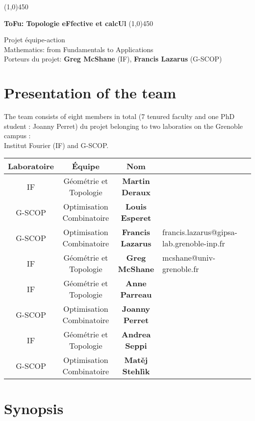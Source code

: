 \documentclass[14pt,fleqn]{article}
\begin{document}
\begin{center}
\line(1,0){450}

\vspace{0.2in}
{\huge \bf ToFu: Topologie eFfective et calcUl}
\vspace{0.2in}
\line(1,0){450}
\bigskip

Projet équipe-action  \\
Mathematics: from Fundamentals to Applications
\\
Porteurs du projet:  {\bf Greg McShane} (IF),  {\bf Francis Lazarus} (G-SCOP)
\end{center}

\section{Presentation of the team}
The team consists of eight members in total (7 tenured faculty and one PhD student : Joanny Perret) du projet belonging to two  laboraties on the Grenoble campus : \\
Institut Fourier (IF) and G-SCOP.

\smallskip
\vspace{.5cm}
\begin{center}
\begin{tabular}[h]{|c|c|c|l|l|}
  \hline
 Laboratoire & Équipe & Nom \\
\hline \hline
IF & Géométrie et Topologie & {\bf Martin Deraux} &\\
\hline
G-SCOP & Optimisation Combinatoire & {\bf Louis Esperet}& \\
\hline
G-SCOP & Optimisation Combinatoire & {\bf Francis Lazarus}& 
francis.lazarus@gipsa-lab.grenoble-inp.fr\\
\hline
IF & Géométrie et Topologie & {\bf Greg McShane}&
mcshane@univ-grenoble.fr \\
\hline
IF & Géométrie et Topologie & {\bf Anne Parreau}& \\
\hline
G-SCOP & Optimisation Combinatoire & {\bf Joanny Perret}& \\
\hline
IF & Géométrie et Topologie & {\bf Andrea Seppi}& \\
\hline
G-SCOP & Optimisation Combinatoire & {\bf Mat\v{e}j Stehlìk}& \\
\hline
\end{tabular}
\end{center}

\section{Synopsis}
\end{document}

